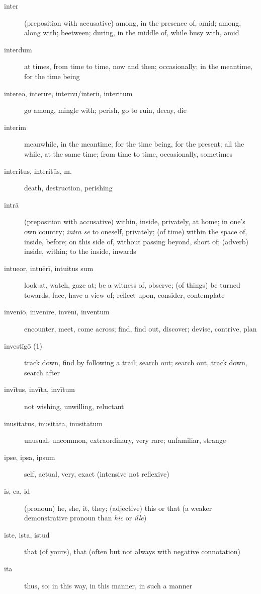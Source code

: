 \begin{description}
    \item[inter] \marginnote{*}(preposition with accusative) among, in the presence of, amid; among, along with; beetween; during, in the middle of, while busy with, amid
    \item[interdum] at times, from time to time, now and then; occasionally; in the meantime, for the time being
    \item[intereō, interīre, interīvī/interiī, interitum] go among, mingle with; perish, go to ruin, decay, die
    \item[interim] \marginnote{*}meanwhile, in the meantime; for the time being, for the present; all the while, at the same time; from time to time, occasionally, sometimes
    \item[interitus, interitūs, m.] death, destruction, perishing
    \item[intrā] \marginnote{*}(preposition with accusative) within, inside, privately, at home; in one's own country; \textit{intrā sē} to oneself, privately; (of time) within the space of, inside, before; on this side of, without passing beyond, short of; (adverb) inside, within; to the inside, inwards
    \item[intueor, intuērī, intuitus sum] look at, watch, gaze at; be a witness of, observe; (of things) be turned towards, face, have a view of; reflect upon, consider, contemplate
    \item[inveniō, invenīre, invēnī, inventum] \marginnote{*}encounter, meet, come across; find, find out, discover; devise, contrive, plan
    \item[investīgō (1)] track down, find by following a trail; search out; search out, track down, search after
    \item[invītus, invīta, invītum] not wishing, unwilling, reluctant
    \item[inūsitātus, inūsitāta, inūsitātum] unusual, uncommon, extraordinary, very rare; unfamiliar, strange
    \item[ipse, ipsa, ipsum] \marginnote{*}self, actual, very, exact (intensive not reflexive)
    \item[is, ea, id] \marginnote{*}(pronoun) he, she, it, they; (adjective) this or that (a weaker demonstrative pronoun than \textit{hic} or \textit{ille})
    \item[iste, ista, istud] \marginnote{*}that (of yours), that (often but not always with negative connotation)
    \item[ita] \marginnote{*}thus, so; in this way, in this manner, in such a manner

\end{description}
